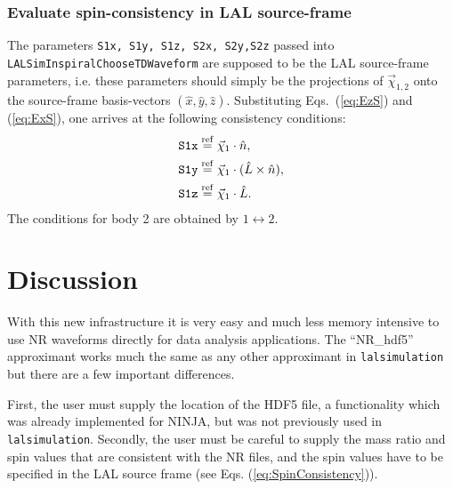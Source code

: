 \documentclass[11pt,tightenlines,article,amssymb,amsmath,amsfonts,superscriptaddress,nofootinbib]{revtex4}
\newcommand{\nNR}{\hat{n}}
\newcommand{\lNR}{\hat L}
\newcommand{\ExS}{{{\hat x}}}
\newcommand{\EyS}{{{\hat y}}}
\newcommand{\EzS}{{{\hat z}}}
\newcommand{\equalref}{\overset{\rm ref}{=}}
\begin{document}
\subsubsection{Evaluate spin-consistency in LAL source-frame}

The parameters {\tt S1x, S1y, S1z, S2x, S2y,S2z} passed into {\tt
  LALSimInspiralChooseTDWaveform} are supposed to be the LAL
source-frame parameters, i.e. these parameters should simply be the
projections of $\vec\chi_{1,2}$ onto the source-frame basis-vectors
$(\ExS,\EyS,\EzS)$.  Substituting Eqs.~(\ref{eq:EzS}) and (\ref{eq:ExS}),
one arrives at the following consistency conditions:
\begin{subequations}
\label{eq:SpinConsistency}
  \begin{align}
    \mbox{\tt S1x} &  \equalref \vec\chi_1 \cdot \nNR,\\
    \mbox{\tt S1y} &  \equalref \vec\chi_1\cdot (\lNR\times\nNR),\\
    \mbox{\tt S1z} &  \equalref \vec\chi_1 \cdot \lNR.
  \end{align}
\end{subequations}
The conditions for body 2 are obtained by $1\leftrightarrow 2$.\\


\section{Discussion}
\label{sec:discussion}

With this new infrastructure it is very easy and much less memory intensive to use NR waveforms
directly for data analysis applications. The ``NR\_hdf5'' approximant works much the same as any other approximant
in \texttt{lalsimulation} but there are a few important differences.

First, the user must supply the location of the HDF5 file, a functionality which was already implemented for NINJA, but was not
previously used in \texttt{lalsimulation}. Secondly, the user must be careful to supply the mass ratio and spin values that
are consistent with the NR files, and the spin values have to be specified in the LAL source frame (see Eqs. (\ref{eq:SpinConsistency})). 
\end{document}
